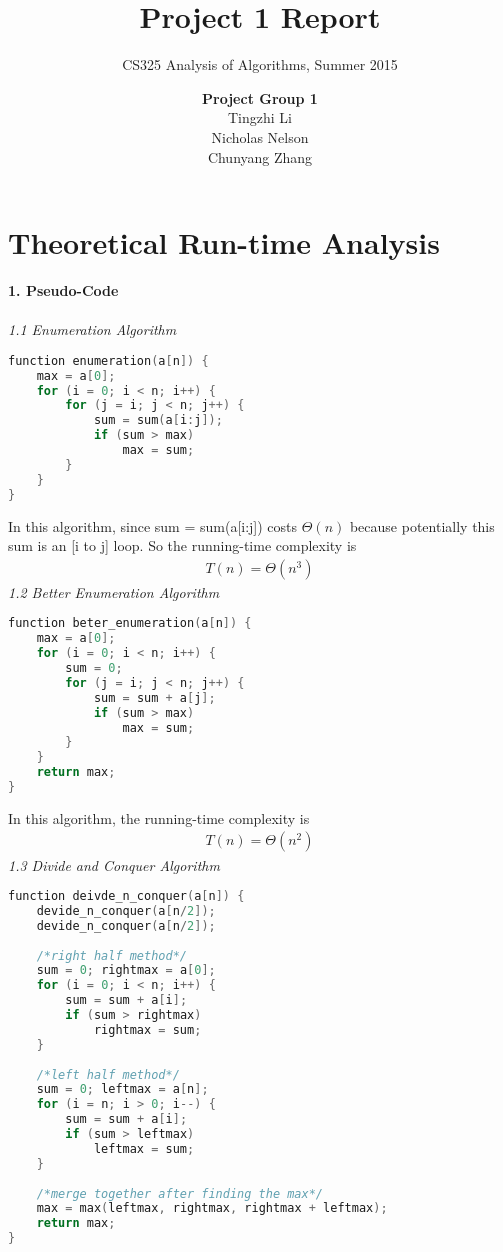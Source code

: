 \documentclass[11pt]{scrreprt}
\title{\textbf{Project 1 Report}}
\subtitle{CS325 Analysis of Algorithms, Summer 2015}
\author{\textbf{Project Group 1}\\
		Tingzhi Li\\
		Nicholas Nelson\\
		Chunyang Zhang}
\date{}
\begin{document}
\maketitle

\chapter{Theoretical Run-time Analysis}

\textbf{1. Pseudo-Code}\\\\
\textit{1.1 Enumeration Algorithm}\\

\begin{lstlisting}[language=c]
function enumeration(a[n]) {
	max = a[0];
	for (i = 0; i < n; i++) {
		for (j = i; j < n; j++) {
			sum = sum(a[i:j]);
			if (sum > max)
				max = sum;
		}
	}
}
\end{lstlisting}

In this algorithm, since sum = sum(a[i:j]) costs $\Theta(n)$ because potentially this sum is an [i to j] loop. So the running-time complexity is
\begin{eqnarray*}
T(n) = \Theta(n^3)
\end{eqnarray*}
\textit{1.2 Better Enumeration Algorithm}\\

\begin{lstlisting}[language=c]
function beter_enumeration(a[n]) {
	max = a[0];
	for (i = 0; i < n; i++) {
		sum = 0;
		for (j = i; j < n; j++) {
			sum = sum + a[j];
			if (sum > max)
				max = sum;
		}
	}
	return max;
}
\end{lstlisting}

In this algorithm, the running-time complexity is
\begin{eqnarray*}
T(n) = \Theta(n^2)
\end{eqnarray*}
\textit{1.3 Divide and Conquer Algorithm}

\begin{lstlisting}[language=c]
function deivde_n_conquer(a[n]) {
	devide_n_conquer(a[n/2]);
	devide_n_conquer(a[n/2]);
	
	/*right half method*/
	sum = 0; rightmax = a[0];
	for (i = 0; i < n; i++) {
		sum = sum + a[i];
		if (sum > rightmax)
			rightmax = sum;
	}
	
	/*left half method*/
	sum = 0; leftmax = a[n];
	for (i = n; i > 0; i--) {
		sum = sum + a[i];
		if (sum > leftmax)
			leftmax = sum;
	}
	
	/*merge together after finding the max*/
	max = max(leftmax, rightmax, rightmax + leftmax);
	return max;
}
\end{lstlisting}
\end{document}
